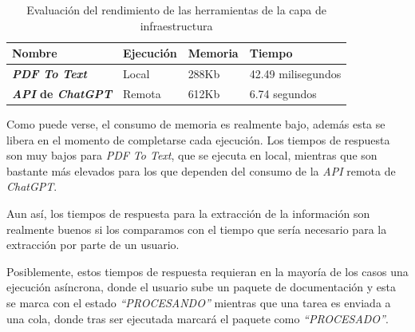 \begin{table}[h]
    \renewcommand{\arraystretch}{1.5}
    \setlength{\tabcolsep}{10pt}
    \begin{tabular}{>{\bfseries}p{} p{} p{} p{}}
        \toprule
        \textbf{Nombre}                  & \textbf{Ejecución} & \textbf{Memoria} & \textbf{Tiempo}    \\
        \midrule
        \textit{PDF To Text}             & Local              & 288Kb            & 42.49 milisegundos \\
        \textit{API} de \textit{ChatGPT} & Remota             & 612Kb            & 6.74 segundos      \\
        \bottomrule
    \end{tabular}
    \caption{Evaluación del rendimiento de las herramientas de la capa de infraestructura}
    \label{tab:execution_performance}
\end{table}

Como puede verse, el consumo de memoria es realmente bajo, además esta se libera en el momento de completarse cada
ejecución.
Los tiempos de respuesta son muy bajos para \textit{PDF To Text}, que se ejecuta en local, mientras que son bastante
más elevados para los que dependen del consumo de la \textit{API} remota de \textit{ChatGPT}.

Aun así, los tiempos de respuesta para la extracción de la información son realmente buenos si los comparamos con el
tiempo que sería necesario para la extracción por parte de un usuario.

Posiblemente, estos tiempos de respuesta requieran en la mayoría de los casos una ejecución asíncrona, donde el usuario
sube un paquete de documentación y esta se marca con el estado \textit{``PROCESANDO''} mientras que una tarea es
enviada a una cola, donde tras ser ejecutada marcará el paquete como \textit{``PROCESADO''}.
